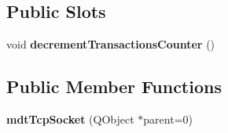 \subsection*{Public Slots}
\begin{DoxyCompactItemize}
\item 
\hypertarget{classmdt_tcp_socket_a826d1c8df5a852a396878587606812b8}{
void {\bfseries decrementTransactionsCounter} ()}
\label{classmdt_tcp_socket_a826d1c8df5a852a396878587606812b8}

\end{DoxyCompactItemize}
\subsection*{Public Member Functions}
\begin{DoxyCompactItemize}
\item 
\hypertarget{classmdt_tcp_socket_aeed1a50725a8e61f86de2bf67a92feb8}{
{\bfseries mdtTcpSocket} (QObject $\ast$parent=0)}
\label{classmdt_tcp_socket_aeed1a50725a8e61f86de2bf67a92feb8}


\end{DoxyCompactItemize}

